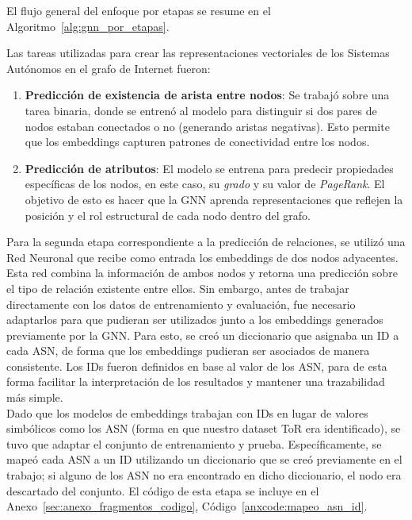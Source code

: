 El flujo general del enfoque por etapas se resume en el Algoritmo~\ref{alg:gnn_por_etapas}.





Las tareas utilizadas para crear las representaciones vectoriales de los Sistemas Autónomos en el grafo de Internet fueron:\\

\begin{enumerate}

    \item \textbf{Predicción de existencia de arista entre nodos}: Se trabajó sobre una tarea binaria, donde se entrenó al modelo para distinguir si dos pares de nodos estaban conectados o no (generando aristas negativas). Esto permite que los embeddings capturen patrones de conectividad entre los nodos.

    \item \textbf{Predicción de atributos}: El modelo se entrena para predecir propiedades específicas de los nodos, en este caso, su \textit{grado} y su valor de \textit{PageRank}. El objetivo de esto es hacer que la GNN aprenda representaciones que reflejen la posición y el rol estructural de cada nodo dentro del grafo.

\end{enumerate}




Para la segunda etapa correspondiente a la predicción de relaciones, se utilizó una Red Neuronal que recibe como entrada los embeddings de dos nodos adyacentes. Esta red combina la información de ambos nodos y retorna una predicción sobre el tipo de relación existente entre ellos. Sin embargo, antes de trabajar directamente con los datos de entrenamiento y evaluación, fue necesario adaptarlos para que pudieran ser utilizados junto a los embeddings generados previamente por la GNN. Para esto, se creó un diccionario que asignaba un ID a cada ASN, de forma que los embeddings pudieran ser asociados de manera consistente. Los IDs fueron definidos en base al valor de los ASN, para de esta forma facilitar la interpretación de los resultados y mantener una trazabilidad más simple.\\



Dado que los modelos de embeddings trabajan con IDs en lugar de valores simbólicos como los ASN (forma en que nuestro dataset ToR era identificado), se tuvo que adaptar el conjunto de entrenamiento y prueba. Específicamente, se mapeó cada ASN a un ID utilizando un diccionario que se creó previamente en el trabajo; si alguno de los ASN no era encontrado en dicho diccionario, el nodo era descartado del conjunto. El código de esta etapa se incluye en el Anexo~\ref{sec:anexo_fragmentos_codigo}, Código~\ref{anxcode:mapeo_asn_id}.\\



